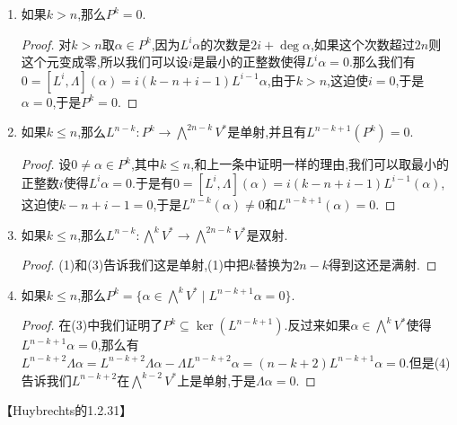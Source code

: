 \begin{enumerate}
\begin{enumerate}[(1)]
\begin{proof}
    		考虑子空间$\langle v,Lv,L^2v,\cdots\rangle$,按照我们之前证明的$[L^i,\Lambda](\alpha)=i(k-n+i-1)L^{i-1}(\alpha)$,得到这个子空间关于$\Lambda$不变,它当然也是关于$L$不变的,又从$[L,\Lambda]=H$得到$Hv=-\Lambda Lv$在这个子空间中,进而从$HL-LH=2L$归纳得到$HL^iv$也在这个子空间中,综上我们证明了子空间$\langle v,Lv,L^2v,\cdots\rangle$是关于$\mathfrak{sl}(2)$不变的,结合上一段就说明$\bigwedge^{\bullet}V^*$的不可约表示一定具有这个形式.于是如果记$P^{k-2i}$的一组实基为$\alpha_{ij},j\in J_i$,那么有$\bigwedge^kV^*=\oplus \langle L^i(\alpha_{ij})\rangle=\bigoplus_{i\ge0}L^i(P^{k-2i})$.
    	\end{proof}
        \item 如果$k>n$,那么$P^k=0$.
        \begin{proof}
        	
        	对$k>n$取$\alpha\in P^k$,因为$L^i\alpha$的次数是$2i+\deg\alpha$,如果这个次数超过$2n$则这个元变成零,所以我们可以设$i$是最小的正整数使得$L^i\alpha=0$.那么我们有$0=[L^i,\Lambda](\alpha)=i(k-n+i-1)L^{i-1}\alpha$,由于$k>n$,这迫使$i=0$,于是$\alpha=0$,于是$P^k=0$.
        \end{proof}
        \item 如果$k\le n$,那么$L^{n-k}:P^k\to\bigwedge^{2n-k}V^*$是单射,并且有$L^{n-k+1}(P^k)=0$.
        \begin{proof}
        	
        	设$0\not=\alpha\in P^k$,其中$k\le n$,和上一条中证明一样的理由,我们可以取最小的正整数$i$使得$L^i\alpha=0$.于是有$0=[L^i,\Lambda](\alpha)=i(k-n+i-1)L^{i-1}(\alpha)$,这迫使$k-n+i-1=0$,于是$L^{n-k}(\alpha)\not=0$和$L^{n-k+1}(\alpha)=0$.
        \end{proof}
        \item 如果$k\le n$,那么$L^{n-k}:\bigwedge^kV^*\to\bigwedge^{2n-k}V^*$是双射.
        \begin{proof}
        	
        	(1)和(3)告诉我们这是单射,(1)中把$k$替换为$2n-k$得到这还是满射.
        \end{proof}
        \item 如果$k\le n$,那么$P^k=\{\alpha\in\bigwedge^kV^*\mid L^{n-k+1}\alpha=0\}$.
        \begin{proof}
        	
        	在(3)中我们证明了$P^k\subseteq\ker(L^{n-k+1})$.反过来如果$\alpha\in\bigwedge^kV^*$使得$L^{n-k+1}\alpha=0$,那么有$L^{n-k+2}\Lambda\alpha=L^{n-k+2}\Lambda\alpha-\Lambda L^{n-k+2}\alpha=(n-k+2)L^{n-k+1}\alpha=0$.但是(4)告诉我们$L^{n-k+2}$在$\bigwedge^{k-2}V^*$上是单射,于是$\Lambda\alpha=0$.
        \end{proof}
    \end{enumerate}

    【Huybrechts的1.2.31】
\end{enumerate}






